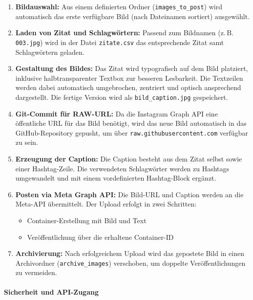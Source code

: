 \documentclass[a4paper,12pt]{article}
\begin{document}
\begin{enumerate}
    \item \textbf{Bildauswahl:} Aus einem definierten Ordner (\texttt{images\_to\_post}) wird automatisch das erste verfügbare Bild (nach Dateinamen sortiert) ausgewählt.

    \item \textbf{Laden von Zitat und Schlagwörtern:} Passend zum Bildnamen (z.\,B. \texttt{003.jpg}) wird in der Datei \texttt{zitate.csv} das entsprechende Zitat samt Schlagwörtern geladen.

    \item \textbf{Gestaltung des Bildes:} Das Zitat wird typografisch auf dem Bild platziert, inklusive halbtransparenter Textbox zur besseren Lesbarkeit. Die Textzeilen werden dabei automatisch umgebrochen, zentriert und optisch ansprechend dargestellt. Die fertige Version wird als \texttt{bild\_caption.jpg} gespeichert.

    \item \textbf{Git-Commit für RAW-URL:} Da die Instagram Graph API eine öffentliche URL für das Bild benötigt, wird das neue Bild automatisch in das GitHub-Repository gepusht, um über \texttt{raw.githubusercontent.com} verfügbar zu sein.

    \item \textbf{Erzeugung der Caption:} Die Caption besteht aus dem Zitat selbst sowie einer Hashtag-Zeile. Die verwendeten Schlagwörter werden zu Hashtags umgewandelt und mit einem vordefinierten Hashtag-Block ergänzt.

    \item \textbf{Posten via Meta Graph API:} Die Bild-URL und Caption werden an die Meta-API übermittelt. Der Upload erfolgt in zwei Schritten:
    \begin{itemize}
        \item Container-Erstellung mit Bild und Text
        \item Veröffentlichung über die erhaltene Container-ID
    \end{itemize}

    \item \textbf{Archivierung:} Nach erfolgreichem Upload wird das gepostete Bild in einen Archivordner (\texttt{archive\_images}) verschoben, um doppelte Veröffentlichungen zu vermeiden.
\end{enumerate}

\paragraph{Sicherheit und API-Zugang}
\end{document}
